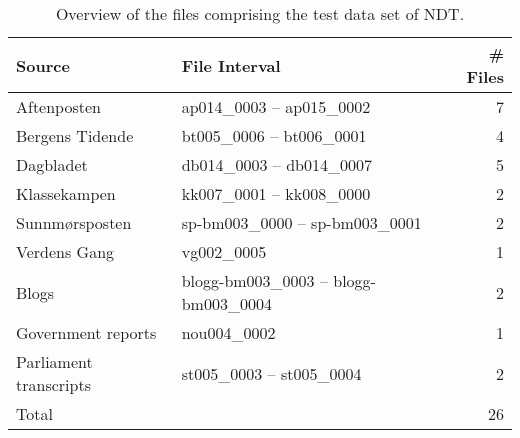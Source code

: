 \documentclass[a4paper,12pt,english]{book}
\begin{document}
\begin{appendices}
    \begin{table}
        \centering
        \smaller[0.5]
        \begin{tabular}{@{}llr@{}}
            \toprule
            \textbf{Source} & \textbf{File Interval} & \textbf{\# Files} \\
            \midrule
            Aftenposten &  ap014\_0003 -- ap015\_0002 & 7 \\
            Bergens Tidende &  bt005\_0006 -- bt006\_0001 & 4 \\
            Dagbladet &  db014\_0003 -- db014\_0007 & 5 \\
            Klassekampen &  kk007\_0001 -- kk008\_0000 & 2 \\
            Sunnmørsposten &  sp-bm003\_0000 -- sp-bm003\_0001 & 2 \\
            Verdens Gang & vg002\_0005 & 1 \\
            Blogs & blogg-bm003\_0003 -- blogg-bm003\_0004 & 2 \\
            Government reports & nou004\_0002 & 1 \\
            Parliament transcripts &  st005\_0003 -- st005\_0004 & 2 \\
            \midrule
            Total & & 26 \\
            \bottomrule
        \end{tabular}
        \caption{Overview of the files comprising the test data set of NDT.}
        \label{testdatasetsplit}
    \end{table}



\end{appendices}
\end{document}
